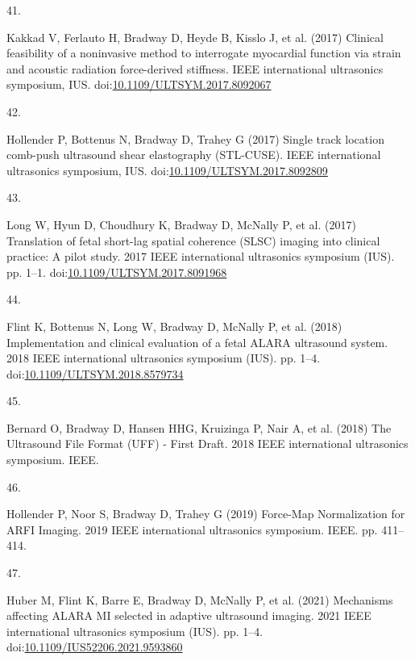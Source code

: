 \documentclass[
]{article}
\newlength{\cslhangindent}
\newlength{\csllabelwidth}
\newlength{\cslentryspacingunit} %
\newenvironment{CSLReferences}[2] %
 {%
  \setlength{\parindent}{0pt}
  \ifodd #1
  \let\oldpar\par
  \def\par{\hangindent=\cslhangindent\oldpar}
  \fi
  \setlength{\parskip}{#2\cslentryspacingunit}
 }%
 {}
\newcommand{\CSLLeftMargin}[1]{\parbox[t]{\csllabelwidth}{#1}}
\newcommand{\CSLRightInline}[1]{\parbox[t]{\linewidth - \csllabelwidth}{#1}\break}
\begin{document}
\begin{CSLReferences}{0}{0}
\leavevmode{}%
\CSLLeftMargin{41. }
\CSLRightInline{Kakkad V, Ferlauto H, Bradway D, Heyde B, Kisslo J, et
al. (2017) {Clinical feasibility of a noninvasive method to interrogate
myocardial function via strain and acoustic radiation force-derived
stiffness}. IEEE international ultrasonics symposium, IUS.
doi:\href{https://doi.org/10.1109/ULTSYM.2017.8092067}{10.1109/ULTSYM.2017.8092067}}

\leavevmode{}%
\CSLLeftMargin{42. }
\CSLRightInline{Hollender P, Bottenus N, Bradway D, Trahey G (2017)
{Single track location comb-push ultrasound shear elastography
(STL-CUSE)}. IEEE international ultrasonics symposium, IUS.
doi:\href{https://doi.org/10.1109/ULTSYM.2017.8092809}{10.1109/ULTSYM.2017.8092809}}

\leavevmode{}%
\CSLLeftMargin{43. }
\CSLRightInline{Long W, Hyun D, Choudhury K, Bradway D, McNally P, et
al. (2017) Translation of fetal short-lag spatial coherence (SLSC)
imaging into clinical practice: A pilot study. 2017 IEEE international
ultrasonics symposium (IUS). pp. 1--1.
doi:\href{https://doi.org/10.1109/ULTSYM.2017.8091968}{10.1109/ULTSYM.2017.8091968}}

\leavevmode{}%
\CSLLeftMargin{44. }
\CSLRightInline{Flint K, Bottenus N, Long W, Bradway D, McNally P, et
al. (2018) Implementation and clinical evaluation of a fetal ALARA
ultrasound system. 2018 IEEE international ultrasonics symposium (IUS).
pp. 1--4.
doi:\href{https://doi.org/10.1109/ULTSYM.2018.8579734}{10.1109/ULTSYM.2018.8579734}}

\leavevmode{}%
\CSLLeftMargin{45. }
\CSLRightInline{Bernard O, Bradway D, Hansen HHG, Kruizinga P, Nair A,
et al. (2018) {The Ultrasound File Format (UFF) - First Draft}. 2018
IEEE international ultrasonics symposium. IEEE.}

\leavevmode{}%
\CSLLeftMargin{46. }
\CSLRightInline{Hollender P, Noor S, Bradway D, Trahey G (2019)
{Force-Map Normalization for ARFI Imaging}. 2019 IEEE international
ultrasonics symposium. IEEE. pp. 411--414.}

\leavevmode{}%
\CSLLeftMargin{47. }
\CSLRightInline{Huber M, Flint K, Barre E, Bradway D, McNally P, et al.
(2021) Mechanisms affecting ALARA MI selected in adaptive ultrasound
imaging. 2021 IEEE international ultrasonics symposium (IUS). pp. 1--4.
doi:\href{https://doi.org/10.1109/IUS52206.2021.9593860}{10.1109/IUS52206.2021.9593860}}

\end{CSLReferences}
\end{document}
